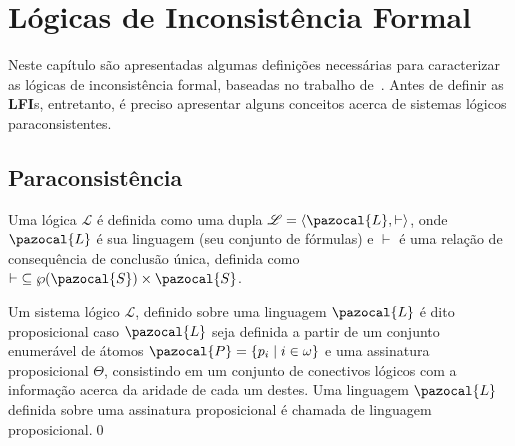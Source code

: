 \chapter{Lógicas de Inconsistência Formal}
\label{cap:LFIs}
Neste capítulo são apresentadas algumas definições necessárias para caracterizar as lógicas de inconsistência formal, baseadas no trabalho de~. Antes de definir as \textbf{LFI}s, entretanto, é preciso apresentar alguns conceitos acerca de sistemas lógicos paraconsistentes.

    \section{Paraconsistência}
    Uma lógica $\mathcal{L}$ é definida como uma dupla $\mathcal{L} = \langle \pazocal{L},\vdash \rangle$, onde $\pazocal{L}$ é sua linguagem (seu conjunto de fórmulas) e $\vdash$ é uma relação de consequência de conclusão única, definida como $\vdash \;\subseteq \wp(\pazocal{S})\times\pazocal{S}$.

    \begin{definicao}
        Um sistema lógico $\mathcal{L}$, definido sobre uma linguagem $\pazocal{L}$ é dito proposicional caso $\pazocal{L}$ seja definida a partir de um conjunto enumerável de átomos $\pazocal{P} = \{p_{i} \;| \; i \in \omega \}$ e uma assinatura proposicional $\Theta$, consistindo em um conjunto de conectivos lógicos com a informação acerca da aridade de cada um destes. Uma linguagem $\pazocal{L}$ definida sobre uma assinatura proposicional é chamada de linguagem proposicional.\qed{}
    \end{definicao}


